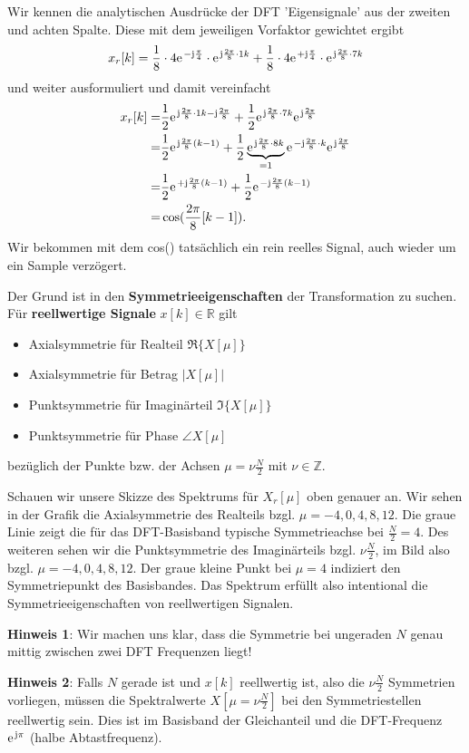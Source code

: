 \begin{ExCalc}
Wir kennen die analytischen Ausdrücke der DFT 'Eigensignale' aus der zweiten
und achten Spalte. Diese mit dem jeweiligen Vorfaktor gewichtet ergibt
\begin{align}
x_r[k]
=
\frac{1}{8} \cdot 4 \e^{-\im\frac{\pi}{4}} \cdot  \e^{\im \frac{2\pi}{8}\cdot 1 k}+
\frac{1}{8} \cdot 4 \e^{+\im\frac{\pi}{4}} \cdot  \e^{\im \frac{2\pi}{8}\cdot 7 k}
\end{align}
%
und weiter ausformuliert und damit vereinfacht
\begin{align}
x_r[k]
=
&\frac{1}{2} \e^{\im \frac{2\pi}{8}\cdot 1 k - \im\frac{2\pi}{8}}+
\frac{1}{2} \e^{\im \frac{2\pi}{8}\cdot 7 k} \e^{\im\frac{2\pi}{8}}\\
=
&\frac{1}{2} \e^{\im \frac{2\pi}{8} (k-1)}+
\frac{1}{2} \underbrace{\e^{\im \frac{2\pi}{8}\cdot 8 k}}_{=1} \e^{- \im \frac{2\pi}{8}\cdot k} \e^{\im\frac{2\pi}{8}}\\
=
&\frac{1}{2} \e^{+\im \frac{2\pi}{8} (k-1)}+
\frac{1}{2} \e^{-\im \frac{2\pi}{8} (k-1)}\\
=
&\cos(\frac{2\pi}{8} [k-1]).
\end{align}
Wir bekommen mit dem cos() tatsächlich ein rein reelles Signal, auch wieder
um ein Sample verzögert.

Der Grund ist in den \textbf{Symmetrieeigenschaften} der Transformation zu
suchen. Für \textbf{reellwertige Signale} $x[k]\in\mathbb{R}$ gilt
\begin{itemize}
  \item Axialsymmetrie für Realteil $\Re\{X[\mu]\}$
  \item Axialsymmetrie für Betrag $|X[\mu]|$
  \item Punktsymmetrie für Imaginärteil $\Im\{X[\mu]\}$
  \item Punktsymmetrie für Phase $\angle X[\mu]$
\end{itemize}
bezüglich der Punkte bzw. der Achsen $\mu = \nu \frac{N}{2}$ mit $\nu\in\mathbb{Z}$.

Schauen wir unsere Skizze des Spektrums für $X_r[\mu]$ oben genauer an.
Wir sehen in der Grafik die Axialsymmetrie des Realteils
bzgl. $\mu=-4,0,4,8,12$. Die graue
Linie zeigt die für das DFT-Basisband typische Symmetrieachse bei $\frac{N}{2}=4$.
Des weiteren sehen wir die Punktsymmetrie des Imaginärteils bzgl. $\nu \frac{N}{2}$,
im Bild also bzgl. $\mu=-4,0,4,8,12$. Der graue kleine Punkt bei $\mu=4$ indiziert
den Symmetriepunkt des Basisbandes.
Das Spektrum erfüllt also intentional
die Symmetrieeigenschaften von reellwertigen Signalen.

\textbf{Hinweis 1}: Wir machen uns klar, dass die Symmetrie bei ungeraden $N$
genau mittig zwischen zwei DFT Frequenzen liegt!

\textbf{Hinweis 2}:
Falls $N$ gerade ist und $x[k]$ reellwertig ist, also die $\nu \frac{N}{2}$
Symmetrien vorliegen, müssen die Spektralwerte $X[\mu = \nu \frac{N}{2}]$
bei den Symmetriestellen reellwertig sein.
Dies ist im Basisband der Gleichanteil und die DFT-Frequenz
$\e^{\im\pi}$ (halbe Abtastfrequenz).
\end{ExCalc}





